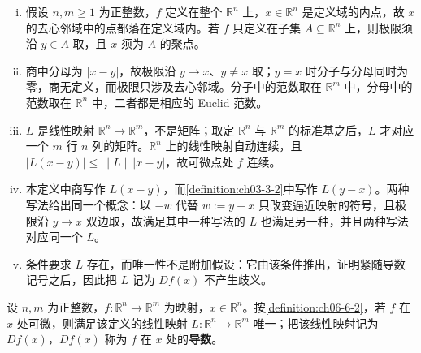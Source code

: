 \documentclass[../../main.tex]{subfiles}%
\begin{document}
\begin{remark}\label{remark:ch06-def-6-2-条件}
\begin{enumerate}[(i)]
\item 假设 $n,m\geqslant1$ 为正整数，$f$ 定义在整个 $\mathbb{R}^n$ 上，$x\in\mathbb{R}^n$ 是定义域的内点，故 $x$ 的去心邻域中的点都落在定义域内。若 $f$ 只定义在子集 $A\subseteq\mathbb{R}^n$ 上，则极限须沿 $y\in A$ 取，且 $x$ 须为 $A$ 的聚点。
\item 商中分母为 $\lvert x-y\rvert$，故极限沿 $y\to x$、$y\neq x$ 取；$y=x$ 时分子与分母同时为零，商无定义，而极限只涉及去心邻域。分子中的范数取在 $\mathbb{R}^m$ 中，分母中的范数取在 $\mathbb{R}^n$ 中，二者都是相应的 Euclid 范数。
\item $L$ 是线性映射 $\mathbb{R}^n\to\mathbb{R}^m$，不是矩阵；取定 $\mathbb{R}^n$ 与 $\mathbb{R}^m$ 的标准基之后，$L$ 才对应一个 $m$ 行 $n$ 列的矩阵。$\mathbb{R}^n$ 上的线性映射自动连续，且 $\lvert L(x-y)\rvert\leqslant\lVert L\rVert\lvert x-y\rvert$，故可微点处 $f$ 连续。
\item 本定义中商写作 $L(x-y)$，而\cref{definition:ch03-3-2}中写作 $L(y-x)$。两种写法给出同一个概念：以 $-w$ 代替 $w:=y-x$ 只改变逼近映射的符号，且极限沿 $y\to x$ 双边取，故满足其中一种写法的 $L$ 也满足另一种，并且两种写法对应同一个 $L$。%
\item 条件要求 $L$ 存在，而唯一性不是附加假设：它由该条件推出，证明紧随导数记号之后，因此把 $L$ 记为 $Df(x)$ 不产生歧义。
\end{enumerate}
\end{remark}

\begin{definition*}[导数记号]\label{definition:ch06-def-6-2-导数}
设 $n,m$ 为正整数，$f:\mathbb{R}^n\to\mathbb{R}^m$ 为映射，$x\in\mathbb{R}^n$。按\cref{definition:ch06-6-2}，若 $f$ 在 $x$ 处可微，则满足该定义的线性映射 $L:\mathbb{R}^n\to\mathbb{R}^m$ 唯一；把该线性映射记为 $Df(x)$，$Df(x)$ 称为 $f$ 在 $x$ 处的\textbf{导数}。%
\end{definition*}
\end{document}
